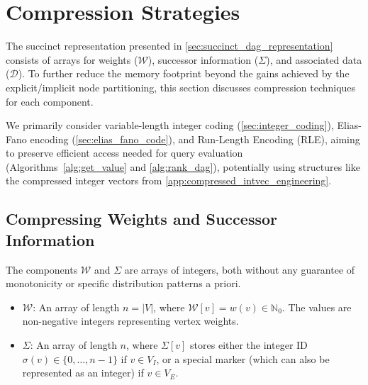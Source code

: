 \section{Compression Strategies}
\label{sec:compression_strategies}

The succinct representation presented in \autoref{sec:succinct_dag_representation} consists of arrays for weights ($\mathcal{W}$), successor information ($\Sigma$), and associated data ($\mathcal{D}$). To further reduce the memory footprint beyond the gains achieved by the explicit/implicit node partitioning, this section discusses compression techniques for each component.

We primarily consider variable-length integer coding (\autoref{sec:integer_coding}), Elias-Fano encoding (\autoref{sec:elias_fano_code}), and Run-Length Encoding (RLE), aiming to preserve efficient access needed for query evaluation (Algorithms~\ref{alg:get_value} and \ref{alg:rank_dag}), potentially using structures like the compressed integer vectors from \autoref{app:compressed_intvec_engineering}.

\subsection{Compressing Weights and Successor Information}
\label{subsec:compressing_W_Sigma}

The components $\mathcal{W}$ and $\Sigma$ are arrays of integers, both without any guarantee of monotonicity or specific distribution patterns a priori.
\begin{itemize}
    \item $\mathcal{W}$: An array of length $n = |V|$, where $\mathcal{W}[v] = w(v) \in \mathbb{N}_0$. The values are non-negative integers representing vertex weights.
    \item $\Sigma$: An array of length $n$, where $\Sigma[v]$ stores either the integer ID $\sigma(v) \in \{0, \dots, n-1\}$ if $v \in V_I$, or a special marker (which can also be represented as an integer) if $v \in V_E$.
\end{itemize}


